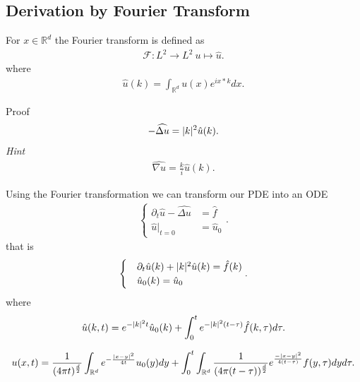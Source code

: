 \subsection{Derivation by Fourier Transform}
\begin{definition}
 For $x \in  \mathbb{R}^{d} $ the Fourier transform is defined as
\begin{align*}
  \mathcal{F} : L^2 \to  L^2 \ u \mapsto \hat{u} 
.\end{align*}
where
\begin{align*}
  \hat{u} (k) = \int_{\mathbb{R}^{d} } u(x) e^{ix*k}  dx 
.\end{align*}
\end{definition}
\begin{exercise}
  Proof
\begin{align*}
  - \widehat{\Delta u}  = \lvert k\rvert^2 \hat{u}(k)
.\end{align*}
\textit{Hint} 
\begin{align*}
  \widehat{\nabla u} = \frac{k}{i} \hat{u}(k)
.\end{align*}
\end{exercise}
\begin{remark}
 Using the Fourier transformation we can transform our PDE into an ODE 
\begin{align*}
  \begin{cases}
    \partial_t \hat{u} - \widehat{\Delta u} &=\hat{f}\\
   \hat{u} \rvert_{t=0} &= \hat{u}_0
 \end{cases} 
 .\end{align*}
 that is
 \begin{align*}
   \begin{cases}
     &\partial_t \hat{u}(k)  + \lvert k\rvert^2 \hat{u} (k) = \hat{f}(k) \\
     &\hat{u}_0(k)= \hat{u}_0
   \end{cases}
 .\end{align*}
 where 
\begin{align*}
  \hat{u} (k,t)= e^{-\lvert k\rvert^2t} \hat{u}_0(k) + \int_0^{t}  e^{-\lvert k\rvert^2(t-\tau )} \hat{f}(k,\tau ) d \tau 
 .\end{align*}
\end{remark}
\begin{lemma}
 \begin{align*}
   u(x,t) =  \frac{1}{(4\pi t)^{\frac{d}{2}} }\int_{\mathbb{R}^{d} } e^{-\frac{\lvert x-y\rvert^2}{4t}} u_0(y) dy + \int_0^{t} \int_{\mathbb{R}^{d} }   \frac{1}{(4\pi(t-\tau ))^{\frac{d}{2}} } e^{\frac{-\lvert x-y\rvert^2}{4(t-\tau )}} f(y,\tau )dy d\tau 
 .\end{align*}
\end{lemma}
